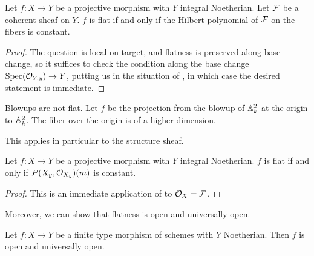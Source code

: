 \begin{proposition}\label{prop: constant hilbert polynomial}
    Let $f:X\to Y$ be a projective morphism with $Y$ integral Noetherian. Let $\mathcal{F}$ be a coherent sheaf on $Y$. $f$ is flat if and only if the Hilbert polynomial of $\mathcal{F}$ on the fibers is constant. 
\end{proposition}
\begin{proof}
    The question is local on target, and flatness is preserved along base change, so it suffices to check the condition along the base change $\operatorname{Spec}(\mathcal{O}_{Y,y})\to Y$, putting us in the situation of , in which case the desired statement is immediate. 
\end{proof}
\begin{example}
    Blowups are not flat. Let $f$ be the projection from the blowup of $\mathbb{A}^{2}_{k}$ at the origin to $\mathbb{A}^{2}_{k}$. The fiber over the origin is of a higher dimension. 
\end{example}
This applies in particular to the structure sheaf. 
\begin{corollary}\label{corr: flatness by Hilbert polynomial}
    Let $f:X\to Y$ be a projective morphism with $Y$ integral Noetherian. $f$ is flat if and only if $P(X_{y},\mathcal{O}_{X_{y}})(m)$ is constant.
\end{corollary}
\begin{proof}
    This is an immediate application of  to $\mathcal{O}_{X}=\mathcal{F}$. 
\end{proof}
Moreover, we can show that flatness is open and universally open. 
\begin{proposition}\label{prop: flatness is universally open}
    Let $f:X\to Y$ be a finite type morphism of schemes with $Y$ Noetherian. Then $f$ is open and universally open.
\end{proposition}
